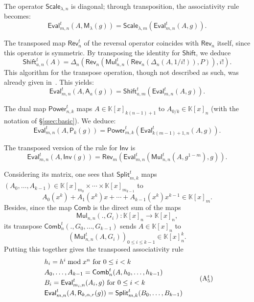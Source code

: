 \documentclass{sig-alternate}
\def\K {\ensuremath{\mathbb{K}}}
\def\M{\ensuremath{\mathsf{M}}}
\def\shift {\ensuremath{\mathsf{A}}}
\def\Shift {\ensuremath{\mathsf{Shift}}}
\def\Scale {\ensuremath{\mathsf{Scale}}}
\def\power {\ensuremath{\mathsf{P}}}
\def\Power {\ensuremath{\mathsf{Power}}}
\def\root {\ensuremath{\mathsf{R}}}
\def\Root {\ensuremath{\mathsf{Split}}}
\def\LinComb {\ensuremath{\mathsf{Comb}}}
\def\Diag{\ensuremath{\mathsf{\Delta}}}
\def\Rev {\ensuremath{\mathsf{Rev}}}
\def\inv {\ensuremath{\mathsf{Inv}}}
\def\mul {\ensuremath{\mathsf{Mul}}}
\def\Eval {\ensuremath{\mathsf{Eval}}}
\begin{document}
\smallskip{} The operator $\Scale_{\lambda,n}$ is
diagonal; through transposition, the associativity rule becomes:
\begin{equation*}\label{AR:1t}\tag{A$_1^t$}\Eval^t_{m,n}(A,\M_\lambda(g)) =
\Scale_{\lambda,m}(\Eval^t_{m,n}(A,g)).\end{equation*}

\smallskip{} The transposed map $\Rev_n^t$ of the
reversal operator coincides with $\Rev_n$ itself, since this operator
is symmetric. By transposing the identity for
$\Shift$, we deduce
\[\Shift_{a,n}^t(A)=
\Diag_n(\Rev_n(\mul^t_{n,n}(\Rev_n(\Diag_n(A,1/i!)),P)),i!).\]
This algorithm for the transpose operation, though not described as
such, was already given in~\cite{Gerhard00}. This yields:
\begin{equation*}\label{AR:3t}\tag{A$_2^t$}\Eval_{m,n}^t(A,\shift_a(g)) = \Shift_{a,m}^t(\Eval^t_{m,n}(A,g)).\end{equation*}
                                                      
\smallskip{}  The dual map $\Power_{n,k}^t$
maps $A \in \K[x]_{k(n-1)+1}$ to $A_{0/k}\in\K[x]_n$ (with the notation
of \S\ref{ssec:basic}). We deduce:
\begin{equation*}\label{AR:4t}\tag{A$_3^t$}
\Eval_{m,n}^t(A,\power_k(g)) = \Power_{m,k}^t(\Eval^t_{k(m-1)+1,n}(A,g)).
\end{equation*}
 
\smallskip{}  The transposed version of the
rule for $\inv$ is
\begin{equation*}\label{AR:2t}\tag{A$_4^t$}
 \Eval_{m,n}^t(A,\inv(g)) =
\Rev_m(\Eval_{m,n}^t(\mul_{n,n}^t(A,g^{1-m}),g)).
\end{equation*}

\smallskip{}
Considering its matrix, one sees that 
$\Root_{m,k}^t$ maps $(A_0,\dots,A_{k-1}) \in \K[x]_{m_0} \times
\cdots \times \K[x]_{m_{k-1}}$ to $$ A_0(x^k) + A_1(x^k) x + \cdots +
A_{k-1}(x^k)x^{k-1} \in \K[x]_m.$$ Besides, since the map $\LinComb$ is
the direct sum of the maps
$$\mul_{n,n}(.,G_i): \K[x]_{n} \to \K[x]_n,$$
its transpose
$\LinComb^t_{n}(.,G_0,\dots,G_{k-1})$ sends $A \in \K[x]_n$ to 
$$ (\mul^t_{n,n}(A,G_i))_{0\le i \le k-1} 
 \in \K[x]_{n}^k.$$ 
Putting this together gives the transposed associativity rule
\begin{equation*}\label{AR:5t}
\begin{array}{l}
  h_i = h^i \bmod x^n \text{~for~} 0 \le i < k\\[1mm]
  A_0,\dots,A_{k-1} = \LinComb^t_{n}(A,h_0,\dots,h_{k-1})\\[1mm]
  B_i = \Eval^t_{m_i,n}(A_{i},g) \text{~for~} 0 \le i < k\\[1mm] 
 \Eval^t_{m,n}(A,\root_{k,\alpha,r}(g)) = \Root^t_{m,k}(B_0,\dots,B_{k-1})\notag\\[1mm]
\end{array}
\tag{A$_5^t$}
\end{equation*}
\end{document}
